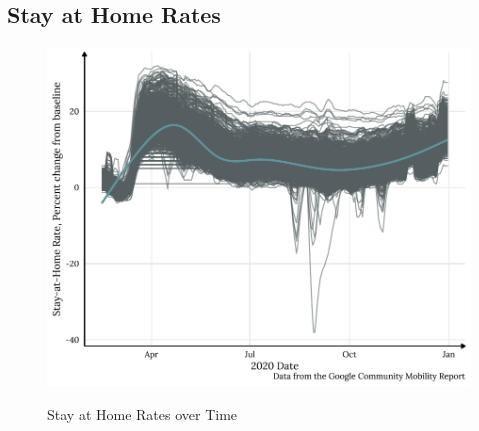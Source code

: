 \hypertarget{stay-at-home-rates}{%
\subsection{Stay at Home Rates}\label{stay-at-home-rates}}



\begin{figure}
{\centering \includegraphics[width=0.8\linewidth]{figs/paper3/plot-google-1}}
\caption{Stay at Home Rates over Time}\label{fig:plot-google}
\end{figure}

